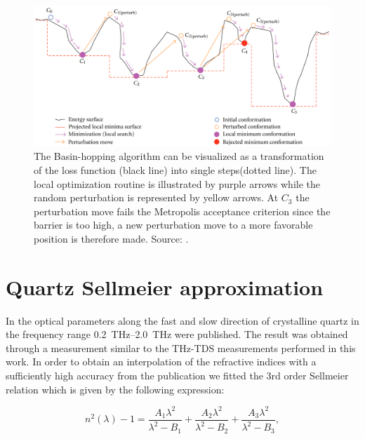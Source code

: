 \begin{figure}[h]
    \centering
    \includegraphics[scale=0.3]{images/7_appendix/bh.png}
    \caption{The Basin-hopping algorithm can be visualized as a transformation of the loss function (black line) into single steps(dotted line). 
    The local optimization routine is illustrated by purple arrows while the random perturbation is represented by yellow arrows. At $C_3$ the perturbation move fails the Metropolis acceptance criterion since the barrier is too high, a new perturbation move to a more favorable position is therefore made. Source: \cite{Olson2012}.}
    \label{fig:Basin-hopping}
\end{figure}

\section{Quartz Sellmeier approximation}
\label{sec:sellmeier}
In \cite{DGrischkowsky1990} the optical parameters along the fast and slow direction of crystalline quartz in the frequency range \SIrange{0.2}{2.0}{\tera\hertz} were published. The result was obtained through a measurement similar to the THz-TDS measurements performed in this work. In order to obtain an interpolation of the refractive indices with a sufficiently high accuracy from the publication we fitted the 3rd order Sellmeier relation which is given by the following expression:

\begin{equation}
    \label{eq:sellmeier}
    n^2(\lambda) - 1 = \frac{A_1\lambda^2}{\lambda^2-B_1}+\frac{A_2\lambda^2}{\lambda^2-B_2}+\frac{A_3\lambda^2}{\lambda^2-B_3},
\end{equation}

